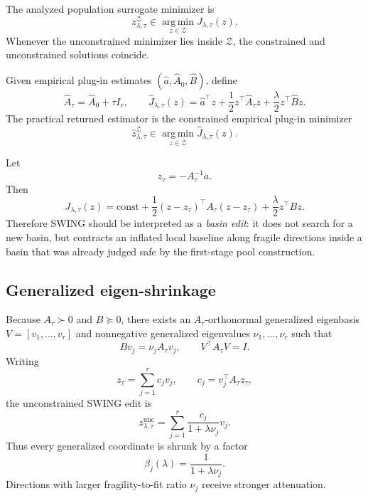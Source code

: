 \documentclass{article}
\newcommand{\cZ}{\mathcal{Z}}
\newcommand{\argmin}{\operatorname*{arg\,min}}
\newcommand{\swing}{\textup{\textsc{SWING}}}
\begin{document}
The analyzed population surrogate minimizer is
\[
z_{\lambda,\tau}^{\cZ}
\in
\argmin_{z\in\cZ} J_{\lambda,\tau}(z).
\]
Whenever the unconstrained minimizer lies inside \(\cZ\), the constrained and unconstrained solutions coincide.

Given empirical plug-in estimates \((\hat a,\hat A_0,\hat B)\), define
\[
\hat A_\tau = \hat A_0 + \tau I_r,
\qquad
\hat J_{\lambda,\tau}(z)
=
\hat a^\top z + \frac12 z^\top \hat A_\tau z + \frac{\lambda}{2} z^\top \hat B z.
\]
The practical returned estimator is the constrained empirical plug-in minimizer
\[
\hat z_{\lambda,\tau}^{\cZ}
\in
\argmin_{z\in\cZ} \hat J_{\lambda,\tau}(z).
\]

Let
\[
z_\tau=-A_\tau^{-1}a.
\]
Then
\[
J_{\lambda,\tau}(z)
=
\text{const}
+
\frac12 (z-z_\tau)^\top A_\tau (z-z_\tau)
+
\frac{\lambda}{2} z^\top B z.
\]
Therefore \swing{} should be interpreted as a \emph{basin edit}: it does not search for a new basin, but contracts an inflated local baseline along fragile directions inside a basin that was already judged safe by the first-stage pool construction.

\subsection{Generalized eigen-shrinkage}

Because \(A_\tau\succ 0\) and \(B\succeq 0\), there exists an \(A_\tau\)-orthonormal generalized eigenbasis \(V=[v_1,\dots,v_r]\) and nonnegative generalized eigenvalues \(\nu_1,\dots,\nu_r\) such that
\[
Bv_j = \nu_j A_\tau v_j,
\qquad
V^\top A_\tau V = I.
\]
Writing
\[
z_\tau = \sum_{j=1}^r c_j v_j,
\qquad
c_j = v_j^\top A_\tau z_\tau,
\]
the unconstrained \swing{} edit is
\[
z_{\lambda,\tau}^{\mathrm{unc}} = \sum_{j=1}^r \frac{c_j}{1+\lambda \nu_j}v_j.
\]
Thus every generalized coordinate is shrunk by a factor
\[
\beta_j(\lambda)=\frac{1}{1+\lambda\nu_j}.
\]
Directions with larger fragility-to-fit ratio \(\nu_j\) receive stronger attenuation.
\end{document}
